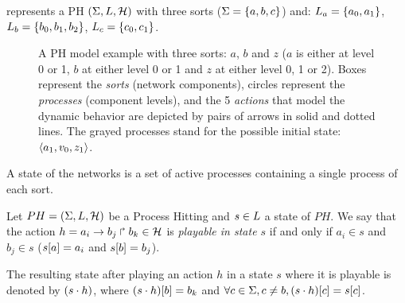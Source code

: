 \begin{example*}
 represents a PH $(\Sigma,L,\mathcal{H})$ with three sorts
($\Sigma = \{a, b, c\}$) and:
$L_a = \{a_0, a_1\}$,
$L_b = \{b_0, b_1, b_2\}$,
$L_c = \{c_0, c_1\}$.
\begin{figure}[ht]
\centering
{}
\caption{\label{fig:ph} 
A PH model example with three sorts: $a$, $b$ and $z$ ($a$ is either at level 0 or 1, $b$ at either level 0 or 1 and $z$ at either level 0, 1 or 2). Boxes represent the \emph{sorts} (network components), circles represent the \emph{processes} (component levels), and the 5 \emph{actions} that model the dynamic behavior are depicted by pairs of arrows in solid and dotted lines. The grayed processes stand for the possible initial state: $\langle a_1, v_0, z_1 \rangle$.
}
\end{figure}
\end{example*}
A state of the networks is a set of active processes containing a single process of each sort.
%

\begin{definition} 
\label{def:playableAction}
Let $PH = (\Sigma,L,\mathcal{H})$ be a Process Hitting and $s \in L$ a state of $PH$. We say that the action $h = a_i\rightarrow b_j\Rsh b_k \in \mathcal{H}$ is \emph{playable in state $s$} if and only if $a_i \in s$ and $b_j \in s$ (\ie ${s[a]} = a_i$ and ${s[b]}=b_j$).
\end{definition}
The resulting state after playing an action $h$ in a state $s$ where it is playable is denoted by $(s \cdot h)$, where ${(s \cdot h)[b]} = b_k$ and $\forall c \in \Sigma, c \neq b, {(s \cdot h)[c]}={s[c]}$.

